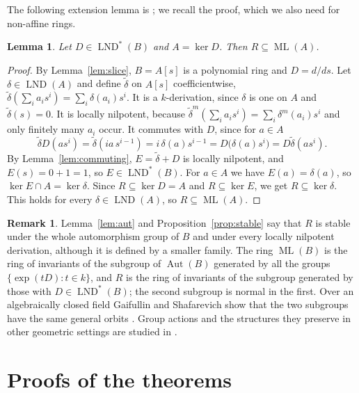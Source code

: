 \documentclass[11pt]{amsart}
\newtheorem{lemma}[theorem]{Lemma}
\theoremstyle{definition}
\newtheorem{remark}[theorem]{Remark}
\DeclareMathOperator{\ML}{ML}
\DeclareMathOperator{\LND}{LND}
\DeclareMathOperator{\Aut}{Aut}
\newcommand{\LNDs}{\LND^{*}}
\begin{document}
The following extension lemma is \cite[Lemma~3.1(i)]{DG21}; we recall the proof, which we also need for non-affine rings.

\begin{lemma}\label{lem:extend}
Let $D\in\LNDs(B)$ and $A=\ker D$. Then $R\subseteq\ML(A)$.
\end{lemma}

\begin{proof}
By Lemma~\ref{lem:slice}, $B=A[s]$ is a polynomial ring and $D=d/ds$. Let $\delta\in\LND(A)$ and define $\tilde\delta$ on $A[s]$ coefficientwise, $\tilde\delta(\sum_i a_is^i)=\sum_i\delta(a_i)s^i$. It is a $k$-derivation, since $\delta$ is one on $A$ and $\tilde\delta(s)=0$. It is locally nilpotent, because $\tilde\delta^m(\sum_ia_is^i)=\sum_i\delta^m(a_i)s^i$ and only finitely many $a_i$ occur. It commutes with $D$, since for $a\in A$
\[
\tilde\delta D(as^i)=\tilde\delta(ia\,s^{i-1})=i\,\delta(a)s^{i-1}=D\bigl(\delta(a)s^i\bigr)=D\tilde\delta(as^i).
\]
By Lemma~\ref{lem:commuting}, $E=\tilde\delta+D$ is locally nilpotent, and $E(s)=0+1=1$, so $E\in\LNDs(B)$. For $a\in A$ we have $E(a)=\delta(a)$, so $\ker E\cap A=\ker\delta$. Since $R\subseteq\ker D=A$ and $R\subseteq\ker E$, we get $R\subseteq\ker\delta$. This holds for every $\delta\in\LND(A)$, so $R\subseteq\ML(A)$.
\end{proof}

\begin{remark}\label{rem:group}
Lemma~\ref{lem:aut} and Proposition~\ref{prop:stable} say that $R$ is stable under the whole automorphism group of $B$ and under every locally nilpotent derivation, although it is defined by a smaller family. The ring $\ML(B)$ is the ring of invariants of the subgroup of $\Aut(B)$ generated by all the groups $\{\exp(tD):t\in k\}$, and $R$ is the ring of invariants of the subgroup generated by those with $D\in\LNDs(B)$; the second subgroup is normal in the first. Over an algebraically closed field Gaifullin and Shafarevich show that the two subgroups have the same general orbits \cite{GS24}. Group actions and the structures they preserve in other geometric settings are studied in \cite{Bha22a,Bha22b,BSN26}.
\end{remark}

\section{Proofs of the theorems}\label{sec:proofs}
\end{document}

